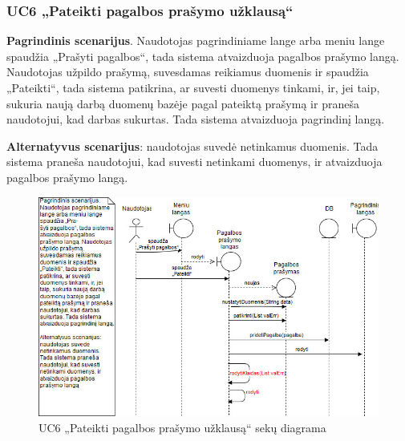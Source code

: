 \documentclass{VUMIFPSbakalaurinis}
\begin{document}
\subsubsection{UC6 „Pateikti pagalbos prašymo užklausą“}
\textbf{Pagrindinis scenarijus}. Naudotojas pagrindiniame lange arba meniu lange spaudžia „Prašyti pagalbos“, tada sistema atvaizduoja pagalbos prašymo langą. Naudotojas užpildo prašymą, suvesdamas reikiamus duomenis ir spaudžia „Pateikti“, tada sistema patikrina, ar suvesti duomenys tinkami, ir, jei taip, sukuria naują darbą duomenų bazėje pagal pateiktą prašymą ir praneša naudotojui, kad darbas sukurtas. Tada sistema atvaizduoja pagrindinį langą.
\par \textbf{Alternatyvus scenarijus}: naudotojas suvedė netinkamus duomenis. Tada sistema praneša naudotojui, kad suvesti netinkami duomenys, ir atvaizduoja pagalbos prašymo langą.

\begin{figure}[H]
	\centering
	\includegraphics[scale=0.6]{img/Sequence/6sequence}
	\caption{UC6 „Pateikti pagalbos prašymo užklausą“ sekų diagrama}
	\label{img:uc6seq}
\end{figure}
\end{document}
